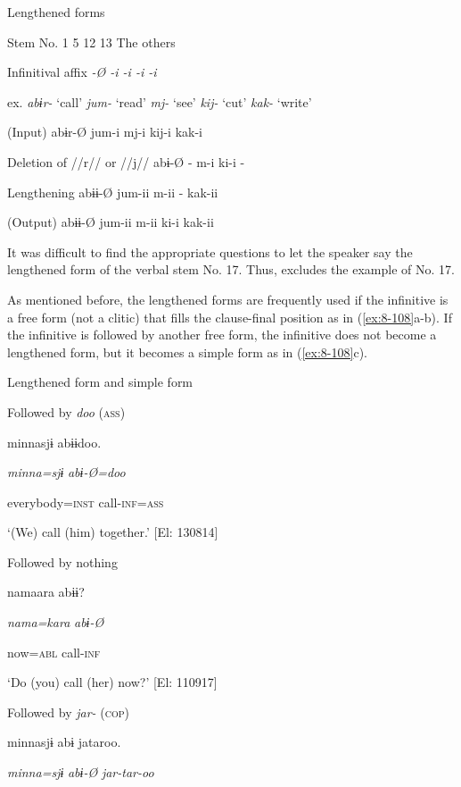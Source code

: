 \begin{table}
\caption{\label{tab:key:83}Lengthened forms}

Stem No.  1  5  12  13  The others

Infinitival affix  \textit{{}-Ø  {}-i  {}-i  {}-i  {}-i}

ex.  \textit{abɨr-} ‘call’  \textit{jum-} ‘read’  \textit{mj-} ‘see’  \textit{kij-} ‘cut’  \textit{kak-} ‘write’

(Input)  abɨr-Ø  jum-i  mj-i  kij-i  kak-i

Deletion of //r// or //j//  abɨ-Ø  {}-  m-i  ki-i  {}-

Lengthening  abɨɨ-Ø  jum-ii  m-ii  {}-  kak-ii

(Output)  abɨɨ-Ø  jum-ii  m-ii  ki-i  kak-ii
\end{table}

It was difficult to find the appropriate questions to let the speaker say the lengthened form of the verbal stem No. 17. Thus,  excludes the example of No. 17. 

As mentioned before, the lengthened forms are frequently used if the infinitive is a free form (not a clitic) that fills the clause-final position as in (\ref{ex:8-108}a-b). If the infinitive is followed by another free form, the infinitive does not become a lengthened form, but it becomes a simple form as in (\ref{ex:8-108}c).

\ea\label{ex:8-108}
  Lengthened form and simple form

\ea Followed by \textit{doo} (\textsc{ass})

    {\TM}
\glll  minnasjɨ  abɨɨdoo.

      \textit{minna=sjɨ}  \textit{abɨ-Ø=doo}

      everybody=\textsc{inst}  call-\textsc{inf}=\textsc{ass}

\glt ‘(We) call (him) together.’ [El: 130814]

\ex  Followed by nothing

    {\TM}
\glll  namaara  abɨɨ?

      \textit{nama=kara}  \textit{abɨ{}-Ø} 

      now=\textsc{abl}  call-\textsc{inf}

\glt ‘Do (you) call (her) now?’ [El: 110917]

\ex  Followed by \textit{jar-} (\textsc{cop})

    {\TM}
\glll  minnasjɨ  abɨ  jataroo.

      \textit{minna=sjɨ}  \textit{abɨ-Ø}  \textit{jar-tar-oo}

